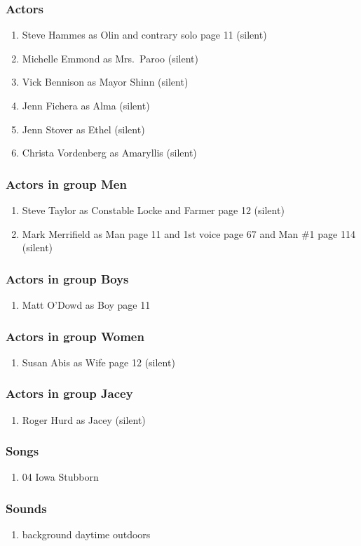 \subsubsection{Actors}
\begin{enumerate}
\item Steve Hammes as Olin and contrary solo page 11 (silent)
\item Michelle Emmond as Mrs.~Paroo (silent)
\item Vick Bennison as Mayor Shinn (silent)
\item Jenn Fichera as Alma (silent)
\item Jenn Stover as Ethel (silent)
\item Christa Vordenberg as Amaryllis (silent)
\end{enumerate}
\subsubsection{Actors in group Men}
\begin{enumerate}
\item Steve Taylor as Constable Locke and Farmer page 12 (silent)
\item Mark Merrifield as Man page 11 and 1st voice page 67 and Man \#1 page 114 (silent)
\end{enumerate}
\subsubsection{Actors in group Boys}
\begin{enumerate}
\item Matt O'Dowd as Boy page 11
\end{enumerate}
\subsubsection{Actors in group Women}
\begin{enumerate}
\item Susan Abis as Wife page 12 (silent)
\end{enumerate}
\subsubsection{Actors in group Jacey}
\begin{enumerate}
\item Roger Hurd as Jacey (silent)
\end{enumerate}

\subsubsection{Songs}
\begin{enumerate}
\item 04 Iowa Stubborn
\end{enumerate}\subsubsection{Sounds}
\begin{enumerate}
\item background daytime outdoors
\end{enumerate}
